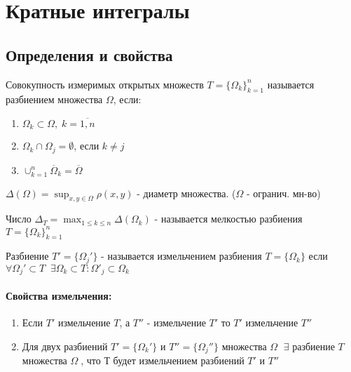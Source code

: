 \section{Кратные интегралы}\vspace{-10pt}
\subsection{Определения и свойства}
\begin{determenition}\vspace{-10pt}
	Совокупность измеримых открытых множеств $T=\{\Omega_k \}_{k=1}^n $ называется разбиением множества $\Omega$, если:
	\begin{enumerate}\vspace{-10pt}
		\item $\Omega_k\subset \Omega, \; k=\overline{1,n} $\vspace{-10pt}
		\item $\Omega_k\cap \Omega_j = \emptyset $, если $k\ne j $\vspace{-10pt}
		\item $\cup_{k=1}^n \overline{\Omega}_k = \overline{\Omega}$
	\end{enumerate}
\end{determenition}

\begin{determenition}\vspace{-10pt}
	$\Delta(\Omega)=\sup_{x,y\in \Omega}\rho(x,y)$ - диаметр множества. ($\Omega  $ - огранич. мн-во)
\end{determenition}

\begin{determenition}\vspace{-10pt}
	Число $\Delta_T=\max_{1\leq k \leq n} \Delta(\Omega_k) $ - называется  мелкостью разбиения $T=\{\Omega_k\}_{k=1}^n$ 
\end{determenition}

\begin{determenition}\vspace{-10pt}
	Разбиение $T'=\{\Omega_j'\} $ - называется измельчением разбиения $T=\{\Omega_k\}$ если $\forall \Omega_j'\subset T \;\; \exists \Omega_k\subset T: \Omega'_j\subset \Omega_k $
\end{determenition}

\paragraph{Свойства измельчения:}\vspace{-10pt}
\begin{enumerate}\vspace{-10pt}
	\item Если $T'$ измельчение $T$, а $T''$ - измельчение $T'$ то $T'$ измельчение $T''$\vspace{-10pt}
	\item Для двух разбиений $T'=\{\Omega_k'\}$ и $T''=\{\Omega_j''\}$ множества $\Omega \;$  $\exists $ разбиение $T $ множества $\Omega \;$, что Т будет измельчением разбиений $T'$ и $T''$
\end{enumerate}


